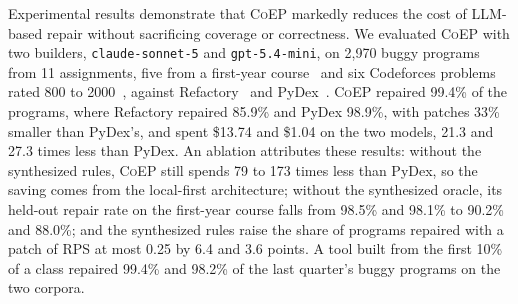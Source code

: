 \documentclass[acmsmall,screen,review,anonymous,nonacm]{acmart}
\newcommand{\tool}{\textsc{CoEP}\xspace}
\newcommand{\cs}{\texttt{claude-sonnet-5}\xspace}
\newcommand{\gm}{\texttt{gpt-5.4-mini}\xspace}
\begin{document}
Experimental results demonstrate that \tool markedly reduces the cost of LLM-based repair without sacrificing coverage or correctness. We evaluated \tool with two builders, \cs and \gm, on 2{,}970 buggy programs from 11 assignments, five from a first-year course~\cite{hu2019re} and six Codeforces problems rated 800 to 2000~\cite{penedo2025codeforces}, against Refactory~\cite{hu2019re} and PyDex~\cite{zhang2024pydex}. \tool repaired 99.4\% of the programs, where Refactory repaired 85.9\% and PyDex 98.9\%, with patches 33\% smaller than PyDex's, and spent \$13.74 and \$1.04 on the two models, 21.3 and 27.3 times less than PyDex. An ablation attributes these results: without the synthesized rules, \tool still spends 79 to 173 times less than PyDex, so the saving comes from the local-first architecture; without the synthesized oracle, its held-out repair rate on the first-year course falls from 98.5\% and 98.1\% to 90.2\% and 88.0\%; and the synthesized rules raise the share of programs repaired with a patch of RPS at most 0.25 by 6.4 and 3.6 points. A tool built from the first 10\% of a class repaired 99.4\% and 98.2\% of the last quarter's buggy programs on the two corpora.
\end{document}
